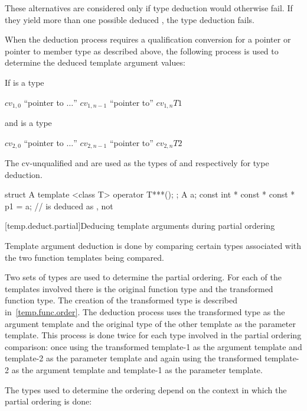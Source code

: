 \pnum
These alternatives are considered only if type deduction would
otherwise fail.
If they yield more than one possible deduced
,
the type deduction fails.

\pnum
When the deduction process requires a qualification conversion for a
pointer or pointer to member type as described above, the following
process is used to determine the deduced template argument values:

If
is a type
\begin{indented}
$\mathit{cv}_{1,0}$ ``pointer to $\ldots$'' $\mathit{cv}_{1,n-1}$ ``pointer to''
$\mathit{cv}_{1,n}\mathit{T1}$
\end{indented}
and
is a type
\begin{indented}
$\mathit{cv}_{2,0}$ ``pointer to $\ldots$'' $\mathit{cv}_{2,n-1}$ ``pointer to''
$\mathit{cv}_{2,n}\mathit{T2}$
\end{indented}
The cv-unqualified
and
are used as the types of
and
respectively for type deduction.
\enterexample
\begin{codeblock}
struct A {
  template <class T> operator T***();
};
A a;
const int * const * const * p1 = a;     //  is deduced as , not 
\end{codeblock}
\exitexample

[temp.deduct.partial]{Deducing template arguments during partial ordering}

\pnum
Template argument deduction is done by comparing certain types associated with
the two function templates being compared.

\pnum
Two sets of types are used to determine the partial ordering.  For each of
the templates involved there is the original function type and the
transformed function type.
\enternote
The creation of the transformed type is described in~\ref{temp.func.order}.
\exitnote
The deduction process uses the
transformed type as the argument template and the original type of the
other template as the parameter template.  This process is done twice
for each type involved in the partial ordering comparison: once using
the transformed template-1 as the argument template and template-2 as
the parameter template and again using the transformed template-2 as
the argument template and template-1 as the parameter template.

\pnum
The types used to determine the ordering depend on the context in which
the partial ordering is done:

